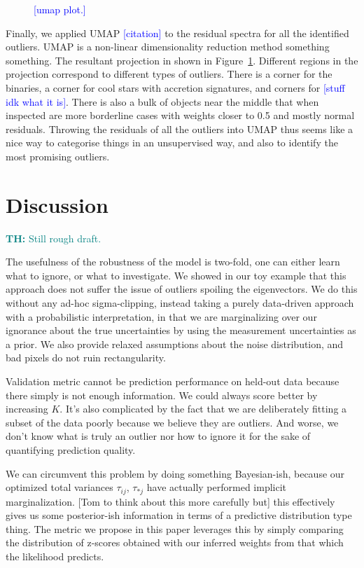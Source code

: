 \documentclass[onecolumn,floatfix]{aastex631}
\newcommand{\tom}[1]{\textcolor{teal}{\textbf{TH:} #1}}
\newcommand{\placeholder}[1]{\textcolor{blue}{[#1]}}
\begin{document}
\begin{figure}
    \centering
    \caption{\placeholder{umap plot.}}
    \label{fig:umap}
\end{figure}

Finally, we applied UMAP \placeholder{citation} to the residual spectra for all the identified outliers.
UMAP is a non-linear dimensionality reduction method something something.
The resultant projection in shown in Figure~\ref{fig:umap}.
Different regions in the projection correspond to different types of outliers.
There is a corner for the binaries, a corner for cool stars with accretion signatures, and corners for \placeholder{stuff idk what it is}.
There is also a bulk of objects near the middle that when inspected are more borderline cases with weights closer to 0.5 and mostly normal residuals.
Throwing the residuals of all the outliers into UMAP thus seems like a nice way to categorise things in an unsupervised way, and also to identify the most promising outliers.

\section{Discussion} \label{sec:discussion}

\tom{Still rough draft.}

The usefulness of the robustness of the model is two-fold, one can either learn what to ignore, or what to investigate.
We showed in our toy example that this approach does not suffer the issue of outliers spoiling the eigenvectors.
We do this without any ad-hoc sigma-clipping, instead taking a purely data-driven approach with a probabilistic interpretation, in that we are marginalizing over our ignorance about the true uncertainties by using the measurement uncertainties as a prior.
We also provide relaxed assumptions about the noise distribution, and bad pixels do not ruin rectangularity.

Validation metric cannot be prediction performance on held-out data because there simply is not enough information.
We could always score better by increasing $K$.
It's also complicated by the fact that we are deliberately fitting a subset of the data poorly because we believe they are outliers.
And worse, we don't know what is truly an outlier nor how to ignore it for the sake of quantifying prediction quality.

We can circumvent this problem by doing something Bayesian-ish, because our optimized total variances $\tau_{ij}$, $\tau_{*j}$ have actually performed implicit marginalization.
[Tom to think about this more carefully but] this effectively gives us some posterior-ish information in terms of a predictive distribution type thing.
The metric we propose in this paper leverages this by simply comparing the distribution of z-scores obtained with our inferred weights from that which the likelihood predicts.
\end{document}
